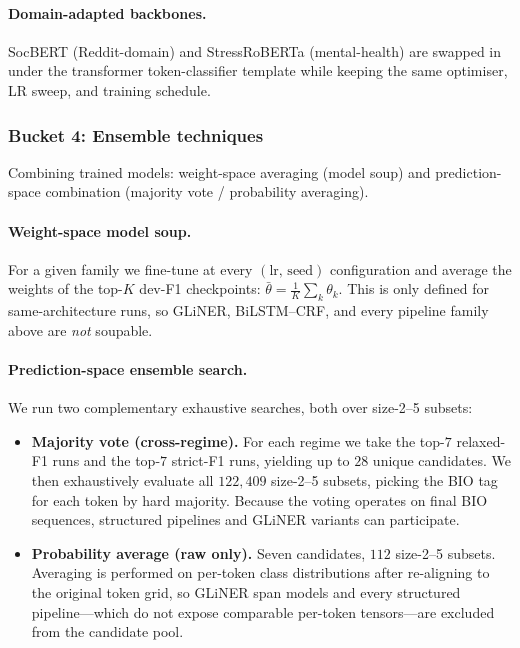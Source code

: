 \documentclass[11pt]{article}
\begin{document}
\paragraph{Domain-adapted backbones.} SocBERT (Reddit-domain) and
StressRoBERTa (mental-health) are swapped in under the transformer
token-classifier template while keeping the same optimiser, LR sweep,
and training schedule.

\subsubsection{Bucket 4: Ensemble techniques}
\label{sec:ensemble}

Combining trained models: weight-space averaging (model soup) and
prediction-space combination (majority vote / probability averaging).

\paragraph{Weight-space model soup.} For a given family we fine-tune
at every $(\mathrm{lr},\,\mathrm{seed})$ configuration and average the
weights of the top-$K$ dev-F1 checkpoints:
$\bar\theta = \tfrac{1}{K}\sum_k \theta_k$. This is only defined for
same-architecture runs, so GLiNER, BiLSTM--CRF, and every pipeline
family above are \emph{not} soupable.

\paragraph{Prediction-space ensemble search.}

We run two complementary exhaustive searches, both over size-2--5 subsets:

\begin{itemize}
\itemsep0em
\item \textbf{Majority vote (cross-regime).} For each regime we take the
top-$7$ relaxed-F1 runs and the top-$7$ strict-F1 runs, yielding up to
$28$ unique candidates. We then exhaustively evaluate all $122{,}409$
size-2--5 subsets, picking the BIO tag for each token by hard majority.
Because the voting operates on final BIO sequences, structured pipelines
and GLiNER variants can participate.
\item \textbf{Probability average (raw only).} Seven candidates, $112$
size-2--5 subsets. Averaging is performed on per-token class
distributions after re-aligning to the original token grid, so GLiNER
span models and every structured pipeline---which do not expose
comparable per-token tensors---are excluded from the candidate pool.
\end{itemize}
\end{document}

